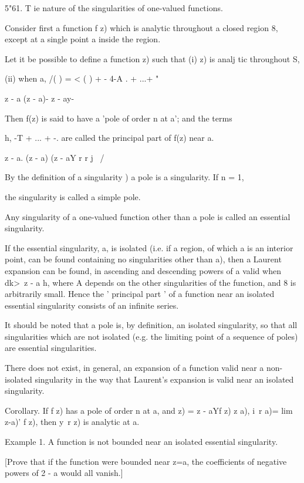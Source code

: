 {{{{5"61. T ie nature of the singularities of one-valued functions.

Consider first a function f z) which is analytic throughout a closed
region 8, except at a single point a inside the region.

Let it be possible to define a function z) such that (i) z) is analj
tic throughout S,

(ii) when a, /( ) = < ( ) + - 4-A . + ...+ "

z - a (z - a)- z - ay-

Then f(z) is said to have a 'pole of order n at a'; and the terms

h, -T + ... + -. are called the principal part of f(z) near a.

z - a. (z - a) (z - aY r r j \ /

By the definition of a singularity ) a pole is a singularity.
If n = 1,

the singularity is called a simple pole.

Any singularity of a one-valued function other than a pole is called
an essential singularity.

If the essential singularity, a, is isolated (i.e. if a region, of
which a is an interior point, can be found containing no singularities
other than a), then a Laurent expansion can be found, in ascending and
descending powers of a valid when dk>\ z - a h, where A depends on the
other singularities of the function, and 8 is arbitrarily small. Hence
the ' principal part ' of a function near an isolated essential
singularity consists of an infinite series.

It should be noted that a pole is, by definition, an isolated
singularity, so that all singularities which are not isolated (e.g.
the limiting point of a sequence of poles) are essential
singularities.

There does not exist, in general, an expansion of a function valid
near a non-isolated singularity in the way that Laurent's expansion is
valid near an isolated singularity.

Corollary. If f z) has a pole of order n at a, and z) = z - aYf z) z
a), i\ r a)= lim z-a)' f z), then y\ r z) is analytic at a.

Example 1. A function is not bounded near an isolated essential
singularity.

[Prove that if the function were bounded near z=a, the coefficients of
negative powers of 2 - a would all vanish.]

%
%

}}}}
